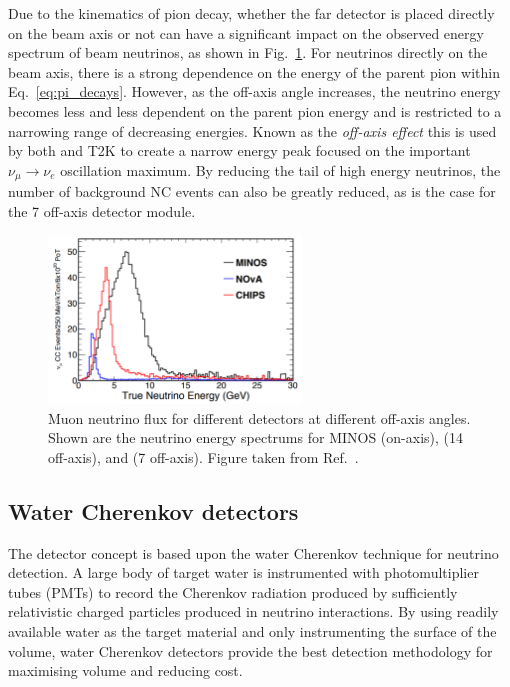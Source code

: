 Due to the kinematics of pion decay, whether the far detector is placed directly on the beam axis
or not can have a significant impact on the observed energy spectrum of beam neutrinos, as shown
in Fig.~\ref{fig:numi_axis}. For neutrinos directly on the beam axis, there is a strong dependence
on the energy of the parent pion within Eq.~\ref{eq:pi_decays}. However, as the off-axis angle
increases, the neutrino energy becomes less and less dependent on the parent pion energy and is
restricted to a narrowing range of decreasing energies. Known as the \emph{off-axis effect} this
is used by both \nova and T2K to create a narrow energy peak focused on the important
$\nu_{\mu}\rightarrow\nu_{e}$ oscillation maximum. By reducing the tail of high energy neutrinos,
the number of background NC events can also be greatly reduced, as is the case for the
\unit{7}{} off-axis \chipsfive detector module.

\begin{figure} %
    \includegraphics[width=0.6\textwidth]{diagrams/4-chips/numi_axis.pdf}
    \caption[Muon neutrino flux for different \numi detectors at different off-axis angles]
    {Muon neutrino flux for different \numi detectors at different off-axis angles. Shown are the
        neutrino energy spectrums for MINOS (on-axis), \nova (\unit{14}{} off-axis),
        and \chipsfive (\unit{7}{} off-axis). Figure taken from
        Ref.~\cite{adamson2013}.}
    \label{fig:numi_axis}
\end{figure}

\subsection{Water Cherenkov detectors} %
\label{sec:chips_concept_cherenkov} %

The \chips detector concept is based upon the water Cherenkov technique for neutrino detection. A
large body of target water is instrumented with photomultiplier tubes (PMTs) to record the
Cherenkov radiation produced by sufficiently relativistic charged particles produced in neutrino
interactions. By using readily available water as the target material and only instrumenting the
surface of the volume, water Cherenkov detectors provide the best detection methodology for
maximising volume and reducing cost.

